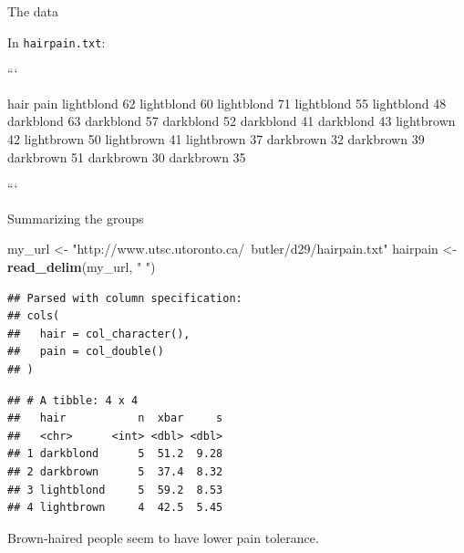 \documentclass[ignorenonframetext,]{beamer}
\newenvironment{Shaded}{\begin{snugshade}}{\end{snugshade}}
\newcommand{\DataTypeTok}[1]{\textcolor[rgb]{0.13,0.29,0.53}{#1}}
\newcommand{\KeywordTok}[1]{\textcolor[rgb]{0.13,0.29,0.53}{\textbf{#1}}}
\newcommand{\NormalTok}[1]{#1}
\newcommand{\OperatorTok}[1]{\textcolor[rgb]{0.81,0.36,0.00}{\textbf{#1}}}
\newcommand{\StringTok}[1]{\textcolor[rgb]{0.31,0.60,0.02}{#1}}
\begin{document}
\begin{frame}[fragile]{The data}
\protect\hypertarget{the-data-6}{}

In \texttt{hairpain.txt}:

\begin{multicols}{2}

```

hair pain
lightblond 62
lightblond 60
lightblond 71
lightblond 55
lightblond 48
darkblond 63
darkblond 57
darkblond 52
darkblond 41
darkblond 43
lightbrown 42
lightbrown 50
lightbrown 41
lightbrown 37
darkbrown 32
darkbrown 39
darkbrown 51
darkbrown 30
darkbrown 35

```

\end{multicols}

\end{frame}

\begin{frame}[fragile]{Summarizing the groups}
\protect\hypertarget{summarizing-the-groups}{}

\begin{Shaded}
\begin{Highlighting}[]
\NormalTok{my_url <-}\StringTok{ "http://www.utsc.utoronto.ca/~butler/d29/hairpain.txt"}
\NormalTok{hairpain <-}\StringTok{ }\KeywordTok{read_delim}\NormalTok{(my_url, }\StringTok{" "}\NormalTok{)}
\end{Highlighting}
\end{Shaded}

\begin{verbatim}
## Parsed with column specification:
## cols(
##   hair = col_character(),
##   pain = col_double()
## )
\end{verbatim}

\begin{Shaded}
\end{Shaded}

\begin{verbatim}
## # A tibble: 4 x 4
##   hair           n  xbar     s
##   <chr>      <int> <dbl> <dbl>
## 1 darkblond      5  51.2  9.28
## 2 darkbrown      5  37.4  8.32
## 3 lightblond     5  59.2  8.53
## 4 lightbrown     4  42.5  5.45
\end{verbatim}

Brown-haired people seem to have lower pain tolerance.

\end{frame}
\end{document}
